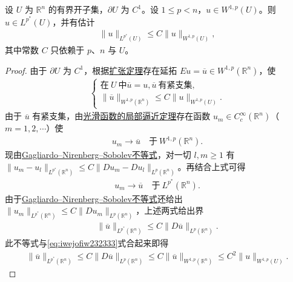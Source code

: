 \documentclass[../../main.tex]{subfiles}
\begin{document}
\begin{theorem}\label{theorem:ch05-W1p估计}
设 $U$ 为 $\mathbb{R}^{n}$ 的有界开子集，$\partial U$ 为 $C^{1}$。设 $1\leqslant p<n$，$u\in W^{1,p}(U)$。则 $u\in L^{p^{*}}(U)$，并有估计
\begin{align*}
\|u\|_{L^{p^{*}}(U)}\leqslant C\|u\|_{W^{1,p}(U)},
\end{align*}
其中常数 $C$ 只依赖于 $p$、$n$ 与 $U$。
\end{theorem}
\begin{proof}
由于 $\partial U$ 为 $C^{1}$，根据\hyperref[theorem:ch05-扩张定理]{扩张定理}存在延拓 $Eu=\overline{u}\in W^{1,p}(\mathbb{R}^{n})$，使
\begin{align}\label{eq:iwejofiw232333}
\begin{cases}
\text{在}\ U\ \text{中}\overline{u}=u,\overline{u}\ \text{有紧支集},\\
\|\overline{u}\|_{W^{1,p}(\mathbb{R}^{n})}\leqslant C\|u\|_{W^{1,p}(U)}.
\end{cases}
\end{align}
由于 $\overline{u}$ 有紧支集，由\hyperref[theorem:ch05-光滑函数的局部逼近定理]{光滑函数的局部逼近定理}存在函数 $u_{m}\in C^{\infty}_{c}(\mathbb{R}^{n})$（$m=1,2,\cdots$）使
\begin{align*}
u_{m}\to\overline{u}\quad\text{于}\ W^{1,p}(\mathbb{R}^{n}).
\end{align*}
现由\hyperref[theorem:Gagliardo--Nirenberg--Sobolev不等式]{Gagliardo--Nirenberg--Sobolev不等式}，对一切 $l,m\geqslant 1$ 有 $\|u_{m}-u_{l}\|_{L^{p^{*}}(\mathbb{R}^{n})}\leqslant C\|Du_{m}-Du_{l}\|_{L^{p}(\mathbb{R}^{n})}$。再结合上式可得
\begin{align*}
u_{m}\to\overline{u}\quad\text{于}\ L^{p^{*}}(\mathbb{R}^{n}).
\end{align*}
由于\hyperref[theorem:Gagliardo--Nirenberg--Sobolev不等式]{Gagliardo--Nirenberg--Sobolev不等式}还给出 $\|u_{m}\|_{L^{p^{*}}(\mathbb{R}^{n})}\leqslant C\|Du_{m}\|_{L^{p}(\mathbb{R}^{n})}$，上述两式给出界
\begin{align*}
\|\overline{u}\|_{L^{p^{*}}(\mathbb{R}^{n})}\leqslant C\|D\overline{u}\|_{L^{p}(\mathbb{R}^{n})}.
\end{align*}
此不等式与\eqref{eq:iwejofiw232333}式合起来即得
\begin{align*}
\|\overline{u}\|_{L^{p^{*}}(\mathbb{R}^{n})}\leqslant C\|D\overline{u}\|_{L^{p}(\mathbb{R}^{n})}\leqslant C\|\overline{u}\|_{W^{1,p}(\mathbb{R}^{n})}\leqslant C^2\|u\|_{W^{1,p}(U)}.
\end{align*}
\end{proof}
\end{document}
